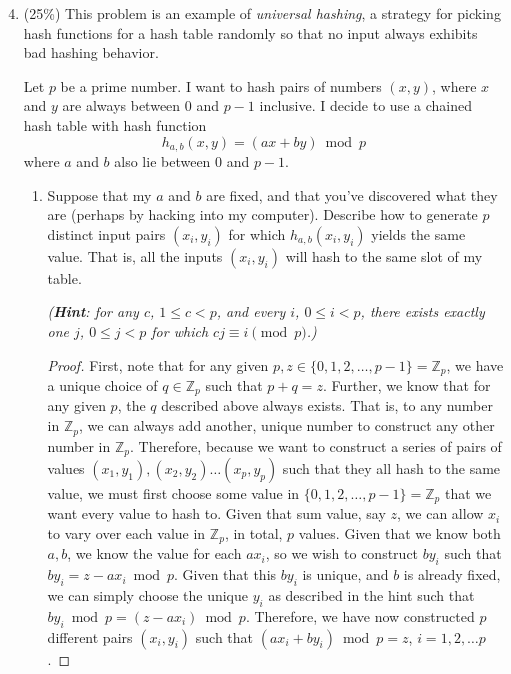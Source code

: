 \documentclass[11pt]{article}
\begin{document}
\begin{enumerate}
\setcounter{enumi}{3}
\item (25\%)
This problem is an example of \textit{universal hashing},
a strategy for picking hash functions for a hash table randomly so
that no input always exhibits bad hashing behavior.

Let $p$ be a prime number.  I want to hash pairs of numbers $(x,y)$,
where $x$ and $y$ are always between 0 and $p-1$ inclusive.  I
decide to use a chained hash table with hash function
\[
h_{a,b}(x,y) = (ax + by) \bmod p
\]
where $a$ and $b$ also lie between 0 and $p-1$.
\begin{enumerate}
\item Suppose that my $a$ and $b$ are fixed, and that you've discovered what
they are (perhaps by hacking into my computer).  Describe how to
generate $p$ distinct input pairs $(x_i, y_i)$ for which
$h_{a,b}(x_i,y_i)$ yields the same value.  That is, all the inputs
$(x_i,y_i)$ will hash to the same slot of my table.

\textit{(\textbf{Hint}: for any $c$, $1 \leq c < p$, and every $i$, $0
\leq i < p$, there exists exactly one $j$, $0 \leq j < p$ for which
$cj \equiv i \pmod p$.)}
\begin{proof}
First, note that for any given $p,z \in \{0,1,2,\ldots,p-1\}= \mathbb{Z}_p$, we have a unique choice of $q \in \mathbb{Z}_p$ such that $p+q=z$.  Further, we know that for any given $p$, the $q$ described above always exists.  That is, to any number in $\mathbb{Z}_p$, we can always add another, unique number to construct any other number in $\mathbb{Z}_p$.  Therefore, because we want to construct a series of pairs of values $(x_1,y_1),(x_2,y_2)\ldots(x_p,y_p)$ such that they all hash to the same value, we must first choose some value in $\{0,1,2,\ldots,p-1\} = \mathbb{Z}_p$ that we want every value to hash to.  Given that sum value, say $z$, we can allow $x_i$ to vary over each value in $\mathbb{Z}_p$, in total, $p$ values.  Given that we know both $a,b$, we know the value for each $ax_i$, so we wish to construct $by_i$ such that $by_i= z - ax_i \bmod p$.  Given that this $by_i$ is unique, and $b$ is already fixed, we can simply choose the unique $y_i$ as described in the hint such that $by_i \bmod p = (z - ax_i) \bmod p$.  Therefore, we have now constructed $p$ different pairs $(x_i,y_i)$ such that $(ax_i+by_i)\bmod p = z$, $i = 1,2,\ldots p$.
\end{proof}




\end{enumerate}
\end{enumerate}
\end{document}
